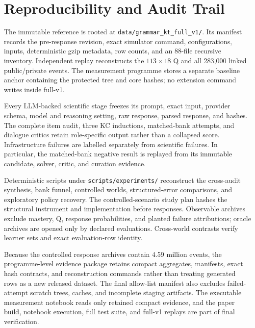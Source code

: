\section{Reproducibility and Audit Trail}

The immutable reference is rooted at
\nolinkurl{data/grammar_kt_full_v1/}.  Its manifest records the pre-response
revision, exact simulator command, configurations, inputs, deterministic gzip
metadata, row counts, and an 88-file recursive inventory.  Independent replay
reconstructs the $113\times18$ Q and all 283,000 linked public/private events.
The measurement programme stores a separate baseline anchor containing the
protected tree and core hashes; no extension command writes inside full-v1.

Every LLM-backed scientific stage freezes its prompt, exact input, provider
schema, model and reasoning setting, raw response, parsed response, and hashes.
The complete item audit, three KC inductions, matched-bank attempts, and
dialogue critics retain role-specific output rather than a collapsed score.
Infrastructure failures are labelled separately from scientific failures.  In
particular, the matched-bank negative result is replayed from its immutable
candidate, solver, critic, and curation evidence.

Deterministic scripts under \nolinkurl{scripts/experiments/} reconstruct the
cross-audit synthesis, bank funnel, controlled worlds, structured-error
comparisons, and exploratory policy recovery.  The controlled-scenario study
plan hashes the structural instrument and implementation before responses.
Observable archives exclude mastery, Q, response probabilities, and planted
failure attributions; oracle archives are opened only by declared evaluations.
Cross-world contrasts verify learner sets and exact evaluation-row identity.

Because the controlled response archives contain 4.59 million events, the
programme-level evidence package retains compact aggregates, manifests, exact
hash contracts, and reconstruction commands rather than treating generated
rows as a new released dataset.  The final allow-list manifest also excludes
failed-attempt scratch trees, caches, and incomplete staging artifacts.  The
executable measurement notebook reads only retained compact evidence, and the
paper build, notebook execution, full test suite, and full-v1 replays are part
of final verification.
